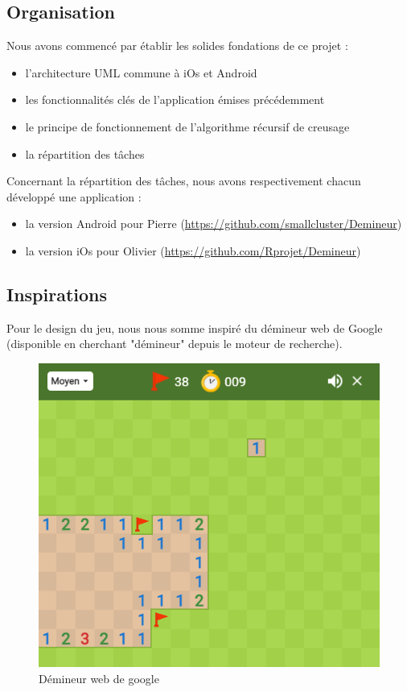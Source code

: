 \documentclass{article}
\begin{document}
\subsection{Organisation}

Nous avons commencé par établir les solides fondations de ce projet :
\begin{itemize}
    \item  l'architecture UML commune à iOs et Android
    \item  les fonctionnalités clés de l'application émises précédemment 
    \item  le principe de fonctionnement de l'algorithme récursif de creusage 
    \item  la répartition des tâches 
\end{itemize}

Concernant la répartition des tâches, nous avons respectivement chacun développé une 
application : 
\begin{itemize}
    \item  la version Android pour Pierre (\url{https://github.com/smallcluster/Demineur})
    \item  la version iOs pour Olivier (\url{https://github.com/Rprojet/Demineur})
\end{itemize}

\subsection{Inspirations}
Pour le design du jeu, nous nous somme inspiré du démineur web de Google (disponible en cherchant "démineur" depuis le moteur de recherche).

\begin{figure}[H]
    \centering
    \includegraphics[width=0.7\linewidth]{demineurGoogle.png}
    \caption{Démineur web de google}
\end{figure}
\end{document}
